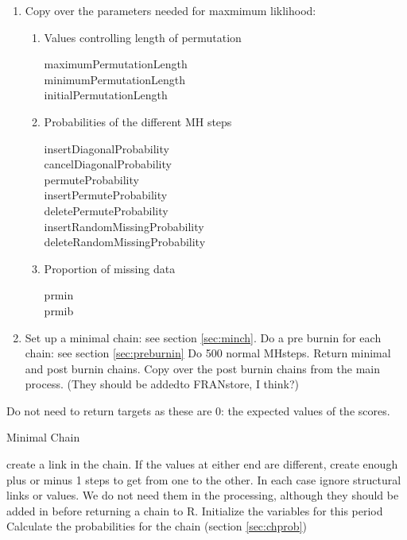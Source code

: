 \documentclass[12pt,a4paper]{article}
\makeatletter
\renewcommand{\=}{\,=\,}
\newcommand{\+}{\,+\,}
\newcommand{\Rn}{{\sf R}}
\renewcommand{\subsection}{\@startsection{subsection}{2}
                {0pt}{0.7\baselineskip}{0.3\baselineskip}
                {\sffamily} }
\makeatother
\begin{document}
\begin{enumerate}
\item Copy over the parameters needed for maxmimum liklihood:
\begin{enumerate}
\item Values controlling length of permutation
\begin{description}
\item[maximumPermutationLength]
\item[minimumPermutationLength]
\item[initialPermutationLength]
\end{description}
\item Probabilities of the different MH steps
\begin{description}
\item[insertDiagonalProbability]
\item[cancelDiagonalProbability]
\item[permuteProbability]
\item[insertPermuteProbability]
\item[deletePermuteProbability]
\item[insertRandomMissingProbability]
\item[deleteRandomMissingProbability]
\end{description}
\item Proportion of missing data
\begin{description}
\item[prmin]
\item[prmib]
\end{description}
\end{enumerate}
\item
\begin{algorithmic}
\STATE Set up a minimal chain: see section \ref{sec:minch}.
\STATE Do a pre burnin for each chain: see section \ref{sec:preburnin}
\STATE Do 500 normal MHsteps.
\STATE Return minimal and post burnin chains.
\ELSE
\STATE Copy over the post burnin chains from the main process.
(They should be addedto FRANstore, I think?)
\ENDIF
\end{algorithmic}
\end{enumerate}
Do not need to return targets as these are 0: the expected values of the scores.

\subsection{Minimal Chain}
\label{sec:minch}
  \begin{algorithmic}
\STATE create a link in the chain.
\ENDFOR
\ELSE[behavior]
\STATE If the values at either end are different, create enough plus or minus 1
steps to get from one to the other.
\ENDIF
\ENDFOR
\ENDFOR
\STATE In each case ignore structural links or values. We do not need them in
the processing, although they should be added in before returning a chain to
\Rn.
\STATE Initialize the variables for this period
\STATE Calculate the probabilities for the chain (section \ref{sec:chprob})
\ENDFOR
  \end{algorithmic}
\end{document}
